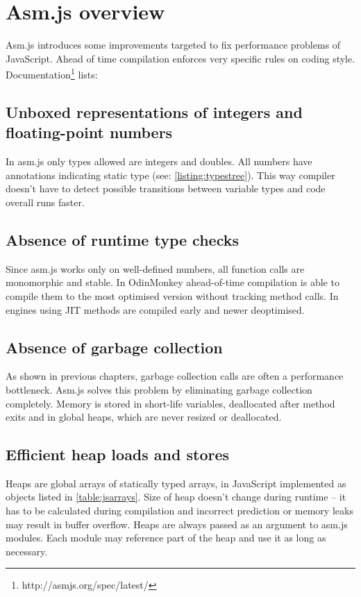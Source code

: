 \section{Asm.js overview}
\label{sec:asmjsoverview}

Asm.js introduces some improvements targeted to fix performance problems of JavaScript. Ahead of time compilation enforces very specific rules on coding style. Documentation\footnote{http://asmjs.org/spec/latest/} lists:

\subsection{Unboxed representations of integers and floating-point numbers}
\label{sec:asmjsunboxed}
In asm.js only types allowed are integers and doubles. All numbers have annotations indicating static type (see: \ref{listing:typestree}). This way compiler doesn't have to detect possible transitions between variable types and code overall runs faster.

\subsection{Absence of runtime type checks}
\label{sec:asmjstypechecks}
Since asm.js works only on well-defined numbers, all function calls are monomorphic and stable. In OdinMonkey ahead-of-time compilation is able to compile them to the most optimised version without tracking method calls. In engines using JIT methods are compiled early and newer deoptimised.

\subsection{Absence of garbage collection}
\label{sec:asmjsgc}
As shown in previous chapters, garbage collection calls are often a performance bottleneck. Asm.js solves this problem by eliminating garbage collection completely. Memory is stored in short-life variables, deallocated after method exits and in global heaps, which are never resized or deallocated.

\subsection{Efficient heap loads and stores}
\label{sec:asmjsheap}

Heaps are global arrays of statically typed arrays, in JavaScript implemented as objects listed in \ref{table:jsarrays}. Size of heap doesn't change during runtime -- it has to be calculated during compilation and incorrect prediction or memory leaks may result in buffer overflow. Heaps are always passed as an argument to asm.js modules. Each module may reference part of the heap and use it as long as necessary.

